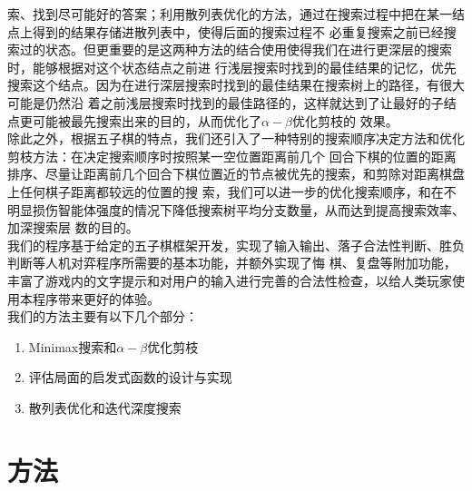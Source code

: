 \documentclass{acm_proc_article-sp}
\begin{document}
索、找到尽可能好的答案；利用散列表优化的方法，通过在搜索过程中把在某一结点上得到的结果存储进散列表中，使得后面的搜索过程不
必重复搜索之前已经搜索过的状态。但更重要的是这两种方法的结合使用使得我们在进行更深层的搜索时，能够根据对这个状态结点之前进
行浅层搜索时找到的最佳结果的记忆，优先搜索这个结点。因为在进行深层搜索时找到的最佳结果在搜索树上的路径，有很大可能是仍然沿
着之前浅层搜索时找到的最佳路径的，这样就达到了让最好的子结点更可能被最先搜索出来的目的，从而优化了$\alpha-\beta$优化剪枝的
效果。\\
除此之外，根据五子棋的特点，我们还引入了一种特别的搜索顺序决定方法和优化剪枝方法：在决定搜索顺序时按照某一空位置距离前几个
回合下棋的位置的距离排序、尽量让距离前几个回合下棋位置近的节点被优先的搜索，和剪除对距离棋盘上任何棋子距离都较远的位置的搜
索，我们可以进一步的优化搜索顺序，和在不明显损伤智能体强度的情况下降低搜索树平均分支数量，从而达到提高搜索效率、加深搜索层
数的目的。\\
我们的程序基于给定的五子棋框架开发，实现了输入输出、落子合法性判断、胜负判断等人机对弈程序所需要的基本功能，并额外实现了悔
棋、复盘等附加功能，丰富了游戏内的文字提示和对用户的输入进行完善的合法性检查，以给人类玩家使用本程序带来更好的体验。\\

我们的方法主要有以下几个部分：
\begin{enumerate}
       \item Minimax搜索和$\alpha-\beta$优化剪枝
       \item 评估局面的启发式函数的设计与实现
       \item 散列表优化和迭代深度搜索
\end{enumerate}

\section{\textbf{方法}}
\end{document}
